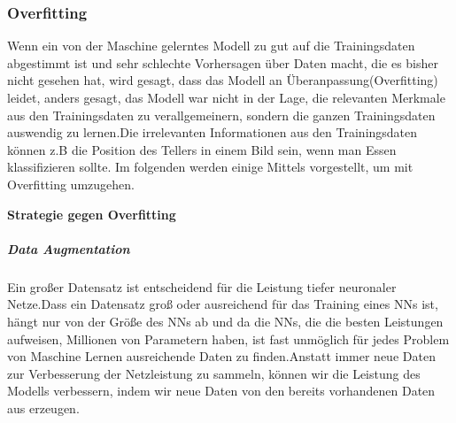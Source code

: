 \documentclass[12pt,a4paper]{scrartcl}
\numberwithin{equation}{section}
\begin{document}
\subsubsection{Overfitting }\label{Overfitting}
Wenn ein von der Maschine gelerntes Modell zu gut auf die Trainingsdaten abgestimmt ist und sehr schlechte Vorhersagen über Daten macht, die es bisher nicht gesehen hat, wird gesagt, dass das Modell an Überanpassung(Overfitting) leidet, anders gesagt, das Modell war nicht in der Lage, die relevanten Merkmale aus den Trainingsdaten zu verallgemeinern, sondern die ganzen Trainingsdaten auswendig zu lernen.Die irrelevanten Informationen aus den Trainingsdaten können z.B die Position des Tellers in einem Bild sein, wenn man Essen klassifizieren sollte. Im folgenden werden einige Mittels vorgestellt, um mit Overfitting umzugehen.\\
\begin{center}
	\textbf{Strategie gegen Overfitting}
\end{center}
\subparagraph{{Data Augmentation}}\label{Data Augmentation}
Ein großer Datensatz ist entscheidend für die Leistung tiefer neuronaler Netze.Dass ein Datensatz groß oder ausreichend für das Training eines \ac{NN}s ist, hängt nur von der Größe des \ac{NN}s ab und da die \acsp{NN}, die die besten Leistungen aufweisen, Millionen von Parametern haben, ist fast unmöglich für jedes  Problem von Maschine Lernen ausreichende Daten zu finden.Anstatt immer neue Daten zur Verbesserung der Netzleistung zu sammeln, können wir die Leistung des Modells verbessern, indem wir neue Daten von den bereits vorhandenen Daten aus erzeugen.\\
\end{document}

